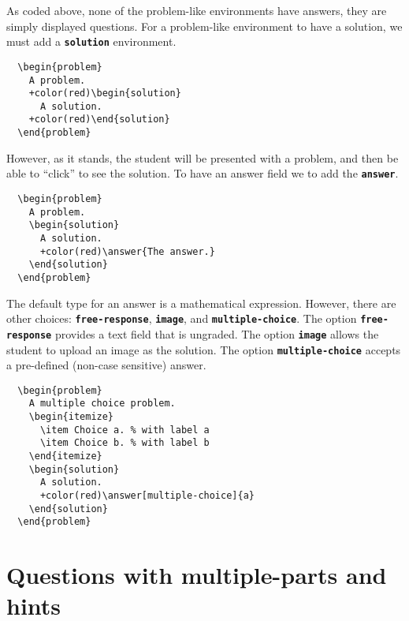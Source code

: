 \documentclass{amsart}
\newcommand\code[1]{{\bfseries\texttt{#1}}}
\begin{document}
As coded above, none of the problem-like environments have answers,
they are simply displayed questions.  For a problem-like environment to
have a solution, we must add a \code{solution} environment.


\begin{Verbatim}
  \begin{problem}
    A problem.
    +color(red)\begin{solution}
      A solution. 
    +color(red)\end{solution}
  \end{problem}
\end{Verbatim}

However, as it stands, the student will be presented with a problem,
and then be able to ``click'' to see the solution. To have an answer
field we to add the \code{answer}.

\begin{Verbatim}
  \begin{problem}
    A problem.
    \begin{solution}
      A solution. 
      +color(red)\answer{The answer.}
    \end{solution}
  \end{problem}
\end{Verbatim}

The default type for an answer is a mathematical expression. However,
there are other choices: \code{free-response}, \code{image}, and
\code{multiple-choice}. The option \code{free-response} provides a
text field that is ungraded. The option \code{image} allows the
student to upload an image as the solution. The option
\code{multiple-choice} accepts a pre-defined (non-case sensitive)
answer.

\begin{Verbatim}
  \begin{problem}
    A multiple choice problem.
    \begin{itemize}
      \item Choice a. % with label a
      \item Choice b. % with label b
    \end{itemize}
    \begin{solution}
      A solution. 
      +color(red)\answer[multiple-choice]{a}
    \end{solution}
  \end{problem}
\end{Verbatim}



\section{Questions with multiple-parts and hints}
\end{document}
